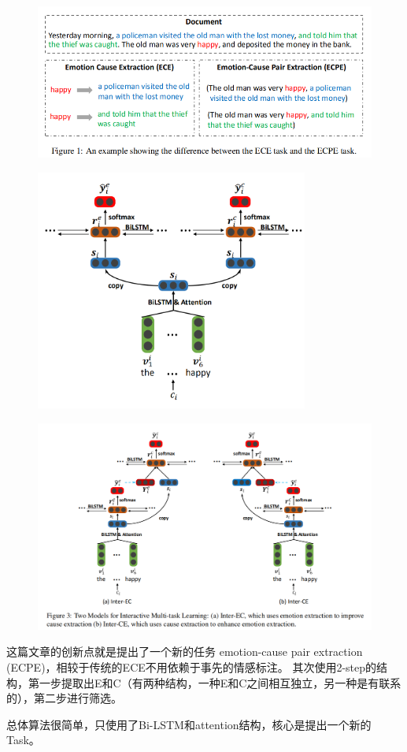 \documentclass[a4paper,UTF8]{article}
\numberwithin{equation}{section}
\begin{document}
\begin{figure}[H]
	\centering
	\includegraphics[width=\textwidth]{3-1.png}
\end{figure}
\begin{figure}[H]
	\centering
	\includegraphics[width=0.8\textwidth]{3-2.png}
\end{figure}
\begin{figure}[H]
	\centering
	\includegraphics[width=\textwidth]{3-3.png}
\end{figure}

这篇文章的创新点就是提出了一个新的任务 emotion-cause pair extraction (ECPE)，相较于传统的ECE不用依赖于事先的情感标注。
其次使用2-step的结构，第一步提取出E和C（有两种结构，一种E和C之间相互独立，另一种是有联系的），第二步进行筛选。

总体算法很简单，只使用了Bi-LSTM和attention结构，核心是提出一个新的Task。
\end{document}

